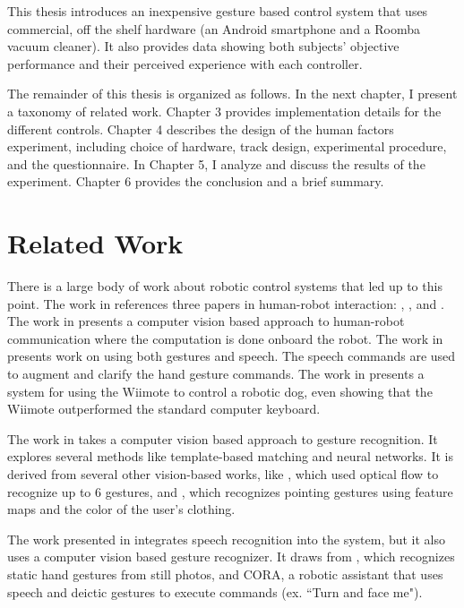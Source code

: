 \documentclass[12pt,a4paper]{report}
\begin{document}
This thesis introduces an inexpensive gesture based control system that uses commercial, off the shelf hardware (an Android smartphone and a Roomba vacuum cleaner). It also provides data showing both subjects' objective performance and their perceived experience with each controller.

The remainder of this thesis is organized as follows. In the next chapter, I present a taxonomy of related work. Chapter 3 provides implementation details for the different controls. Chapter 4 describes the design of the human factors experiment, including choice of hardware, track design, experimental procedure, and the questionnaire. In Chapter 5, I analyze and discuss the results of the experiment. Chapter 6 provides the conclusion and a brief summary. 

\chapter{Related Work}
There is a large body of work about robotic control systems that led up to this point.  The work in \cite{Varcholik_Barber_Nicholson_2008} references three papers in human-robot interaction: \cite{Waldherr}, \cite{Rogalla}, and \cite{Guo}. The work in \cite{Waldherr} presents a computer vision based approach to human-robot communication where the computation is done onboard the robot. The work in \cite{Rogalla} presents work on using both gestures and speech. The speech commands are used to augment and clarify the hand gesture commands. The work in \cite{Guo} presents a system for using the Wiimote to control a robotic dog, even showing that the Wiimote
outperformed the standard computer keyboard.

The work in \cite{Waldherr} takes a computer vision based approach to gesture recognition. It explores several methods like template-based matching and neural networks. It is derived from several other vision-based works, like \cite{Kortenkamp}, which used optical flow to recognize up to 6 gestures, and \cite{Kahn}, which recognizes pointing gestures using feature maps and the color of the user's clothing.

The work presented in \cite{Rogalla} integrates speech recognition into the system, but it also uses a computer vision based gesture recognizer. It draws from \cite{Kestler}, which recognizes static hand gestures from still photos, and CORA, a robotic assistant that uses speech and deictic gestures to execute commands (ex. ``Turn and face me").
\end{document}
